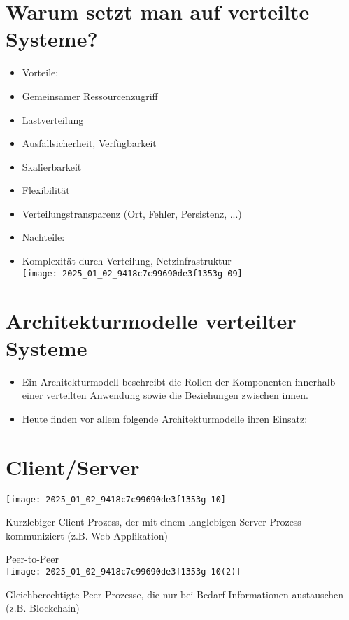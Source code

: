 \documentclass[10pt]{article}
\begin{document}
\section*{Warum setzt man auf verteilte Systeme?}
\begin{itemize}
  \item Vorteile:
  \item Gemeinsamer Ressourcenzugriff
  \item Lastverteilung
  \item Ausfallsicherheit, Verfügbarkeit
  \item Skalierbarkeit
  \item Flexibilität
  \item Verteilungstransparenz (Ort, Fehler, Persistenz, ...)
  \item Nachteile:
  \item Komplexität durch Verteilung, Netzinfrastruktur\\
\texttt{[image: 2025\_01\_02\_9418c7c99690de3f1353g-09]}
\end{itemize}

\section*{Architekturmodelle verteilter Systeme}
\begin{itemize}
  \item Ein Architekturmodell beschreibt die Rollen der Komponenten innerhalb einer verteilten Anwendung sowie die Beziehungen zwischen innen.
  \item Heute finden vor allem folgende Architekturmodelle ihren Einsatz:
\end{itemize}

\section*{Client/Server}
\begin{center}
\texttt{[image: 2025\_01\_02\_9418c7c99690de3f1353g-10]}
\end{center}

Kurzlebiger Client-Prozess, der mit einem langlebigen Server-Prozess kommuniziert (z.B. Web-Applikation)

Peer-to-Peer\\
\texttt{[image: 2025\_01\_02\_9418c7c99690de3f1353g-10(2)]}

Gleichberechtigte Peer-Prozesse, die nur bei Bedarf Informationen austauschen (z.B. Blockchain)
\end{document}
